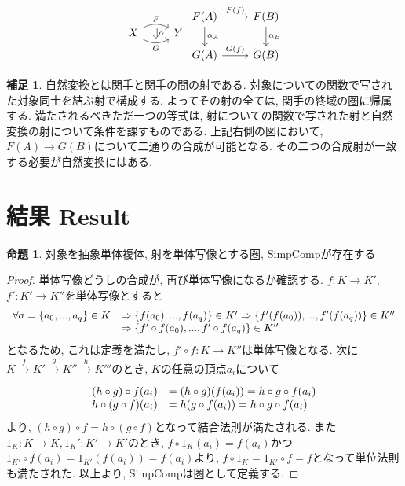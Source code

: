 \documentclass[a4paper]{jsarticle}
\theoremstyle{definition}
\newtheorem{prop}[dfn]{命題}
\newtheorem{hsk}[dfn]{補足}
\newcommand{\SimpComp}{{\mathrm{SimpComp}}}
\begin{document}
\begin{equation}
\begin{tikzcd}
X
\arrow[r, bend left, "F"]
\arrow[r, bend right, swap, "G"]
\arrow[r, phantom, bend left, shift right=0.2ex, ""{name=U}]
\arrow[r, phantom, bend right, shift left=0.2ex, swap, ""{name=D}]
&Y
\arrow[Rightarrow, from=U, to=D, "\alpha"]
\end{tikzcd}
     \begin{tikzcd}
        F(A)\arrow{r}{F(f)} \arrow{d}{\alpha_A} & F(B)\arrow{d}{\alpha_B}\\
        G(A)\arrow{r}{G(f)} & G(B)
    \end{tikzcd}
\end{equation}
\begin{hsk}
    自然変換とは関手と関手の間の射である. 対象についての関数で写された対象同士を結ぶ射で構成する. よってその射の全ては, 関手の終域の圏に帰属する. 満たされるべきただ一つの等式は, 射についての関数で写された射と自然変換の射について条件を課すものである. 上記右側の図において, $F(A)\rightarrow G(B)$について二通りの合成が可能となる. その二つの合成射が一致する必要が自然変換にはある.\\
\end{hsk}
\section{結果 Result}
\begin{prop}
    対象を抽象単体複体, 射を単体写像とする圏, $\SimpComp$が存在する
\end{prop}
\begin{proof}
    単体写像どうしの合成が, 再び単体写像になるか確認する. $f:K\rightarrow K'$, $f':K'\rightarrow K''$を単体写像とすると
\begin{equation}
    \begin{array}{ll}
        \forall\sigma =\{a_0,...,a_q\}\in K & \Rightarrow \{f(a_0),...,f(a_q)\}\in K'\Rightarrow\{f'(f(a_0)),...,f'(f(a_q))\}\in K'' \\
         &  \Rightarrow\{f'\circ f(a_0),...,f'\circ f(a_q)\}\in K''\notag
    \end{array}
\end{equation}
となるため, これは定義を満たし, $f'\circ f:K\rightarrow K''$は単体写像となる. 次に$K\xrightarrow[]{f} K'\xrightarrow[]{g} K''\xrightarrow[]{h}K'''$のとき, $K$の任意の頂点$a_i$について
\begin{equation}
    \begin{array}{ll}
        (h\circ g)\circ f(a_i) & =(h\circ g)(f(a_i))=h\circ g\circ f(a_i) \\
        h\circ (g\circ f)(a_i) & =h(g\circ f(a_i))=h\circ g\circ f(a_i)\notag
    \end{array}
\end{equation}
より, $(h\circ g)\circ f=h\circ (g\circ f)$となって結合法則が満たされる. また$1_K:K\rightarrow K, 1_K':K'\rightarrow K'$のとき, $f\circ 1_K(a_i)=f(a_i)$かつ$1_{K'}\circ f(a_i)=1_{K'}(f(a_i))=f(a_i)$より, $f\circ 1_K=1_{K'}\circ f=f$となって単位法則も満たされた. 以上より, SimpCompは圏として定義する.
\end{proof}
\end{document}
